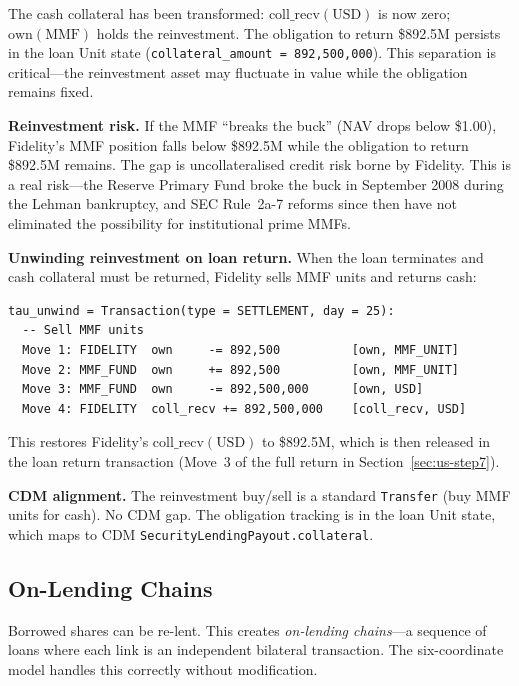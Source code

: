 \documentclass[11pt,a4paper]{article}
\begin{document}
\noindent The cash collateral has been transformed: $\mathrm{coll\_recv}(\text{USD})$ is now zero; $\mathrm{own}(\text{MMF})$ holds the reinvestment. The obligation to return \$892.5M persists in the loan Unit state (\texttt{collateral\_amount = 892,500,000}). This separation is critical---the reinvestment asset may fluctuate in value while the obligation remains fixed.

\medskip
\noindent\textbf{Reinvestment risk.} If the MMF ``breaks the buck'' (NAV drops below \$1.00), Fidelity's MMF position falls below \$892.5M while the obligation to return \$892.5M remains. The gap is uncollateralised credit risk borne by Fidelity. This is a real risk---the Reserve Primary Fund broke the buck in September 2008 during the Lehman bankruptcy, and SEC Rule~2a-7 reforms since then have not eliminated the possibility for institutional prime MMFs.

\medskip
\noindent\textbf{Unwinding reinvestment on loan return.} When the loan terminates and cash collateral must be returned, Fidelity sells MMF units and returns cash:

\begin{lstlisting}
tau_unwind = Transaction(type = SETTLEMENT, day = 25):
  -- Sell MMF units
  Move 1: FIDELITY  own     -= 892,500          [own, MMF_UNIT]
  Move 2: MMF_FUND  own     += 892,500          [own, MMF_UNIT]
  Move 3: MMF_FUND  own     -= 892,500,000      [own, USD]
  Move 4: FIDELITY  coll_recv += 892,500,000    [coll_recv, USD]
\end{lstlisting}

\noindent This restores Fidelity's $\mathrm{coll\_recv}(\text{USD})$ to \$892.5M, which is then released in the loan return transaction (Move~3 of the full return in Section~\ref{sec:us-step7}).

\medskip
\noindent\textbf{CDM alignment.} The reinvestment buy/sell is a standard \texttt{Transfer} (buy MMF units for cash). No CDM gap. The obligation tracking is in the loan Unit state, which maps to CDM \texttt{SecurityLendingPayout.collateral}.

\subsection{On-Lending Chains}
\label{sec:sbl-onlending}

Borrowed shares can be re-lent. This creates \emph{on-lending chains}---a sequence of loans where each link is an independent bilateral transaction. The six-coordinate model handles this correctly without modification.
\end{document}
